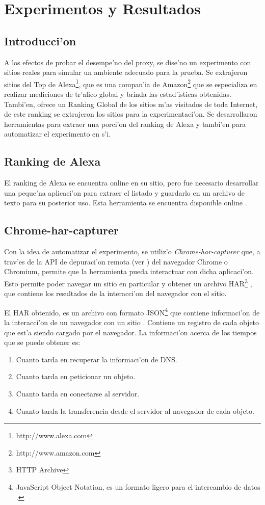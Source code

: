 \chapter{Experimentos y Resultados}
\label{experimentacion}
\section{Introducci'on}

A los efectos de probar el desempe'no del proxy, se dise'no un experimento con sitios reales para simular un ambiente adecuado para la prueba. Se extrajeron sitios del Top de Alexa\footnote{http://www.alexa.com}, que es una compan'ia de Amazon\footnote{http://www.amazon.com} que se especializa en realizar mediciones de tr'afico global y brinda las estad'isticas obtenidas. Tambi'en, ofrece un Ranking Global de los sitios m'as visitados de toda Internet, de este ranking se extrajeron los sitios para la experimentaci'on. Se desarrollaron herramientas para extraer una porci'on del ranking de Alexa y tambi'en para automatizar el experimento en s'i.

\section{Ranking de Alexa}
\label{rankingalexa}
El ranking de Alexa se encuentra online en su sitio, pero fue necesario desarrollar una peque'na aplicaci'on para extraer el listado y guardarlo en un archivo de texto para su posterior uso. Esta herramienta se encuentra disponible online \citep{alexatop}.

\section{Chrome-har-capturer}

Con la idea de automatizar el experimento, se utiliz'o \emph{Chrome-har-capturer} \citep{harcapturer} que, a trav'es de la API de depuraci'on remota (ver \citep{debugger}) del navegador Chrome o Chromium, permite que la herramienta pueda interactuar con dicha aplicaci'on. Esto permite  poder navegar un sitio en particular y obtener un archivo HAR\footnote{HTTP Archive} \citep{harSpec} , que contiene los resultados de la interacci'on del navegador con el sitio.

El HAR obtenido, es un archivo con formato JSON\footnote{JavaScript Object Notation, es un formato ligero para el intercambio de datos \citep{json}.} que contiene informaci'on de la interacci'on de un navegador con un sitio \citep{harSpec}. Contiene un registro de cada objeto que est'a siendo cargado por el navegador. La informaci'on acerca de los tiempos que se puede obtener es:
\begin{enumerate}
\item Cuanto tarda en recuperar la informaci'on de DNS.
\item Cuanto tarda en peticionar un objeto.
\item Cuanto tarda en conectarse al servidor.
\item Cuanto tarda la transferencia desde el servidor al navegador de cada objeto.
\end{enumerate}

